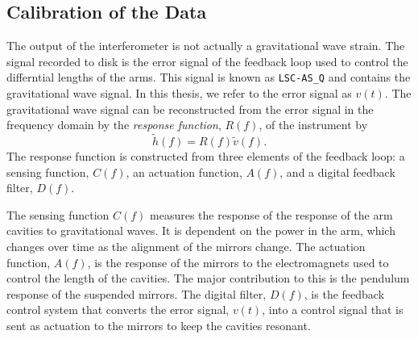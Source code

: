 \subsection{Calibration of the Data}
\label{ss:calibration}

The output of the interferometer is not actually a gravitational wave strain.
The signal recorded to disk is the error signal of the feedback loop used to
control the differntial lengths of the arms. This signal is known as
\texttt{LSC-AS\_Q} and contains the gravitational wave signal.  In this
thesis, we refer to the error signal as $v(t)$.  The gravitational wave signal
can be reconstructed from the error signal in the frequency domain by the
\emph{response function}, $R(f)$, of the instrument by
\begin{equation}
\tilde{h}(f) = R(f) \tilde{v}(f).
\end{equation}
The response function is constructed from three elements of the feedback loop:
a sensing function, $C(f)$, an actuation function, $A(f)$, and a digital
feedback filter, $D(f)$\cite{gaby}. 

The sensing function $C(f)$ measures the response of the response of the arm
cavities to gravitational waves. It is dependent on the power in the arm,
which changes over time as the alignment of the mirrors change.  The actuation
function, $A(f)$, is the response of the mirrors to the electromagnets used to
control the length of the cavities. The major contribution to this is the
pendulum response of the suspended mirrors.  The digital filter, $D(f)$, is
the feedback control system that converts the error signal, $v(t)$, into a
control signal that is sent as actuation to the mirrors to keep the cavities
resonant.

